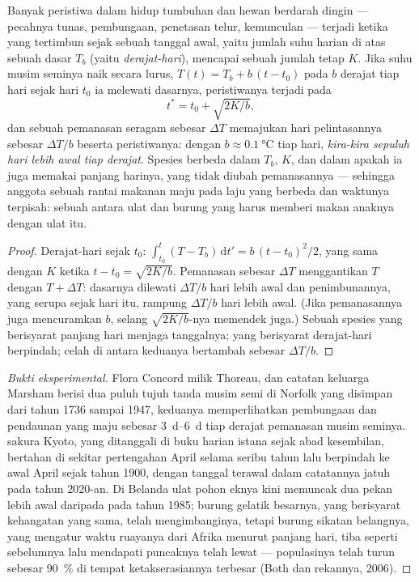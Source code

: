 \begin{theorem}\label{thm:b2:global-change:phenology}
Banyak peristiwa dalam hidup tumbuhan dan hewan berdarah dingin ---
pecahnya tunas, pembungaan, penetasan telur, kemunculan --- terjadi
ketika \emph{} yang tertimbun sejak sebuah tanggal awal,
yaitu jumlah suhu harian di atas sebuah dasar $T_b$ (yaitu
\emph{derajat-hari}), mencapai sebuah jumlah tetap $K$. Jika suhu musim
seminya naik secara lurus, $T(t) = T_b
+ b\,(t - t_0)$ pada $b$ derajat
tiap hari sejak hari $t_0$ ia melewati dasarnya, peristiwanya terjadi
pada
\[
t^{*} = t_0 + \sqrt{2K/b},
\]
dan sebuah pemanasan seragam sebesar $\Delta T$ memajukan hari
pelintasannya sebesar $\Delta T/b$ beserta peristiwanya: dengan $b \approx
\qty{0.1}{\celsius}$ tiap hari, \emph{kira-kira sepuluh hari
lebih awal tiap derajat}. Spesies berbeda dalam $T_b$, $K$, dan dalam
apakah ia juga memakai panjang harinya, yang tidak diubah pemanasannya
--- sehingga anggota sebuah rantai makanan maju pada laju yang berbeda
dan waktunya terpisah: sebuah \emph{} antara ulat
dan burung yang harus memberi makan anaknya dengan ulat itu.
\end{theorem}
\begin{proof}
Derajat-hari sejak $t_0$: $\int_{t_0}^{t}(T - T_b)\,\mathrm{d}t' =
b\,(t - t_0)^{2}/2$, yang sama dengan $K$ ketika $t - t_0 = \sqrt{2K/b}$. Pemanasan sebesar $\Delta T$ menggantikan $T$ dengan $T + \Delta T$: dasarnya dilewati $\Delta T/b$ hari lebih awal dan
penimbunannya, yang serupa sejak hari itu, rampung $\Delta T/b$ hari
lebih awal. (Jika pemanasannya juga mencuramkan $b$, selang
$\sqrt{2K/b}$-nya memendek juga.) Sebuah spesies yang berisyarat
panjang hari menjaga tanggalnya; yang berisyarat derajat-hari
berpindah; celah di antara keduanya bertambah sebesar $\Delta T/b$.
\end{proof}
\begin{proof}[Bukti eksperimental]
Flora Concord milik Thoreau, dan catatan keluarga Marsham berisi dua
puluh tujuh tanda musim semi di Norfolk yang disimpan dari tahun 1736
sampai 1947, keduanya memperlihatkan pembungaan dan pendaunan yang maju
sebesar \qtyrange{3}{6}{d} tiap derajat pemanasan musim seminya. 
sakura Kyoto, yang ditanggali di buku harian istana sejak abad
kesembilan, bertahan di sekitar pertengahan April selama seribu tahun
lalu berpindah ke awal April sejak tahun 1900, dengan tanggal terawal
dalam catatannya jatuh pada tahun 2020-an. Di Belanda ulat pohon eknya
kini memuncak dua pekan lebih awal daripada pada tahun 1985; burung
gelatik besarnya, yang berisyarat kehangatan yang sama, telah
mengimbanginya, tetapi burung sikatan belangnya, yang mengatur waktu
ruayanya dari Afrika menurut panjang hari, tiba seperti sebelumnya lalu
mendapati puncaknya telah lewat --- populasinya telah turun sebesar
\qty{90}{\%} di tempat ketakserasiannya terbesar (Both dan rekannya,
2006).
\end{proof}

